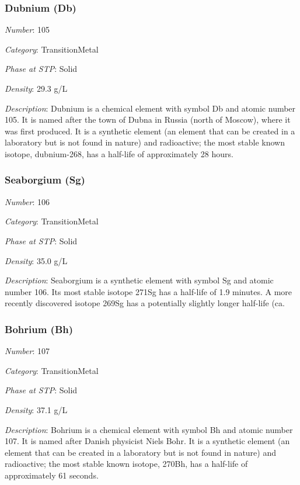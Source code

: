 \documentclass{article}
\begin{document}
\hypertarget{subsubsection::Db}{}\subsubsection{Dubnium (Db)}

\textit{Number}: 105

\textit{Category}: TransitionMetal

\textit{Phase at STP}: Solid

\textit{Density}: 29.3 g/L

\textit{Description}: Dubnium is a chemical element with symbol Db and atomic number 105. It is named after the town of Dubna in Russia (north of Moscow), where it was first produced. It is a synthetic element (an element that can be created in a laboratory but is not found in nature) and radioactive; the most stable known isotope, dubnium-268, has a half-life of approximately 28 hours.

\hypertarget{subsubsection::Sg}{}\subsubsection{Seaborgium (Sg)}

\textit{Number}: 106

\textit{Category}: TransitionMetal

\textit{Phase at STP}: Solid

\textit{Density}: 35.0 g/L

\textit{Description}: Seaborgium is a synthetic element with symbol Sg and atomic number 106. Its most stable isotope 271Sg has a half-life of 1.9 minutes. A more recently discovered isotope 269Sg has a potentially slightly longer half-life (ca.

\hypertarget{subsubsection::Bh}{}\subsubsection{Bohrium (Bh)}

\textit{Number}: 107

\textit{Category}: TransitionMetal

\textit{Phase at STP}: Solid

\textit{Density}: 37.1 g/L

\textit{Description}: Bohrium is a chemical element with symbol Bh and atomic number 107. It is named after Danish physicist Niels Bohr. It is a synthetic element (an element that can be created in a laboratory but is not found in nature) and radioactive; the most stable known isotope, 270Bh, has a half-life of approximately 61 seconds.
\end{document}
